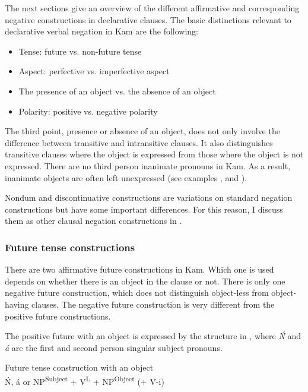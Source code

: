 \documentclass[output=paper,colorlinks,citecolor=brown]{langscibook}
\begin{document}
The next sections give an overview of the different affirmative and corresponding negative constructions in declarative clauses. The basic distinctions relevant to declarative verbal negation in Kam are the following:

\begin{itemize}
    \item Tense: future vs. non-future tense
    \item Aspect: perfective vs. imperfective aspect
    \item The presence of an object vs. the absence of an object 
    \item Polarity: positive vs. negative polarity
\end{itemize}


The third point, presence or absence of an object, does not only involve the difference between transitive and intransitive clauses. It also distinguishes transitive clauses where the object is expressed from those where the object is not expressed. There are no third person inanimate pronouns in Kam. As a result, inanimate objects are often left unexpressed (see examples ,  and ).

Nondum and discontinuative constructions are variations on standard negation constructions but have some important differences. For this reason, I discuss them as other clausal negation constructions in .

\subsubsection{Future tense constructions}\label{sec:kam:2.1.2}

There are two affirmative future constructions in Kam. Which one is used depends on whether there is an object in the clause or not. There is only one negative future construction, which does not distinguish object-less from object-having clauses. The negative future construction is very different from the positive future constructions.

The positive future with an object is expressed by the structure in , where \textit{\'{N}} and \textit{á} are the first and second person singular subject pronouns.

\ea\label{ex:kam:8}
    Future tense construction with an object\\
    \'{N}, á or NP\textsuperscript{Subject} \hspace{3mm} + V\textsuperscript{L} \hspace{3mm}+ NP\textsuperscript{Object} \hspace{3mm}(+ V-i)
\z 
\end{document}
